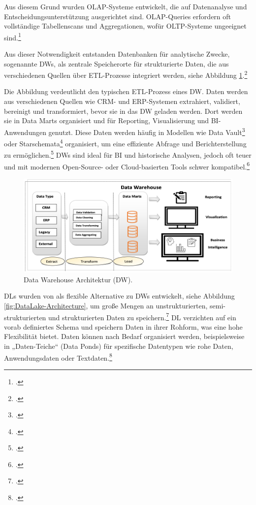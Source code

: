 Aus diesem Grund wurden \ac{OLAP}-Systeme entwickelt, die auf Datenanalyse und Entscheidungsunterstützung ausgerichtet sind. \ac{OLAP}-Queries erfordern oft vollständige Tabellenscans und Aggregationen, wofür \ac{OLTP}-Systeme ungeeignet sind.\footcite[Vgl.][46]{vaismanDataWarehouseSystems2014} 

Aus dieser Notwendigkeit entstanden Datenbanken für analytische Zwecke, sogenannte \ac{DW}s, als zentrale Speicherorte für strukturierte Daten, die aus verschiedenen Quellen über \ac{ETL}-Prozesse integriert werden, siehe Abbildung \ref{fig:DataWarehouse-Architecture}.\footcite[Vgl.][S. 390]{10020719} 

Die Abbildung verdeutlicht den typischen \ac{ETL}-Prozess eines \ac{DW}. Daten werden aus verschiedenen Quellen wie \ac{CRM}- und \ac{ERP}-Systemen extrahiert, validiert, bereinigt und transformiert, bevor sie in das \ac{DW} geladen werden. Dort werden sie in Data Marts organisiert und für Reporting, Visualisierung und \ac{BI}-Anwendungen genutzt. Diese Daten werden häufig in Modellen wie Data Vault\footcite[Vgl.][S. 1]{kimball2013data} oder Starschemata\footcite[Vgl.][S. 1]{linstedt2015building} organisiert, um eine effiziente Abfrage und Berichterstellung zu ermöglichen.\footcite[Vgl.][S. 6]{vaismanDataWarehouseSystems2014}
\ac{DW}s sind ideal für \ac{BI} und historische Analysen, jedoch oft teuer und mit modernen Open-Source- oder Cloud-basierten Tools schwer kompatibel.\footcite[Vgl.][S. 390]{10020719}

\begin{figure}[htb]\label{fig:DataWarehouse-Architecture}
    \centering
    \includegraphics[width=0.7\linewidth]{graphics/dw-architecture.png}
    \caption[Data Warehouse Architektur]{Data Warehouse Architektur (DW).\footnotemark}
    \label{fig:DataWarehouse-Architecture}
    \end{figure}

\ac{DL}s wurden von \cite{dixonPentahoHadoopData2010} als flexible Alternative zu \ac{DW}s entwickelt, siehe Abbildung \ref{fig:DataLake-Architecture}, um große Mengen an unstrukturierten, semi-strukturierten und strukturierten Daten zu speichern.\footcite[Vgl.][S. 390]{10020719} 
\ac{DL} verzichten auf ein vorab definiertes Schema und speichern Daten in ihrer Rohform, was eine hohe Flexibilität bietet. Daten können nach Bedarf organisiert werden, beispielsweise in „Daten-Teiche“ (Data Ponds) für spezifische Datentypen wie rohe Daten, Anwendungsdaten oder Textdaten.\footcite[Vgl.][S. 390]{10020719} 


